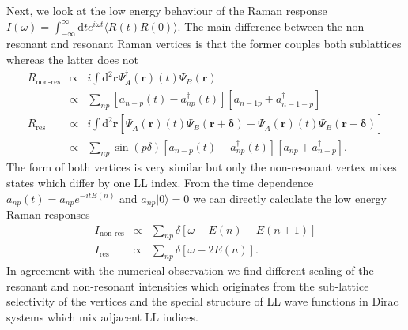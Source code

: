 \documentclass[reprint,amsmath,amssymb,aps,prl,groupedaddress,nofootinbib,superscriptaddress]{revtex4-1}
\newcommand{\1}{\mathds{1}}
\begin{document}
Next, we look at the low energy behaviour of the Raman response $I(\omega)=\int_{-\infty}^{\infty} \text{d}t e^{i\omega t} \langle R(t) R(0)\rangle$. The main difference between the non-resonant and resonant Raman vertices is that the former couples both sublattices whereas the latter does not
\begin{eqnarray}
R_{\text{non-res}} & \propto & i \int \text{d}^2 \mathbf{r}  \Psi^{\dagger}_A(\mathbf{r})(t) \Psi_B(\mathbf{r}) \\ \nonumber
& \propto & \sum_{np} \left[ a_{n-p}(t) -a^{\dagger}_{np} (t) \right] \left[ a_{n-1 p} + a^{\dagger}_{n-1 -p} \right] \\ \nonumber
R_{\text{res}} & \propto & i \int \text{d}^2 \mathbf{r} \left[ \Psi^{\dagger}_A(\mathbf{r})(t) \Psi_B(\mathbf{r+\delta}) - \Psi^{\dagger}_A(\mathbf{r})(t) \Psi_B(\mathbf{r-\delta}) \right] \\ \nonumber
& \propto & \sum_{np} \sin \left(p \delta \right) \left[ a_{n-p}(t) -a^{\dagger}_{np} (t) \right] \left[ a_{n p} + a^{\dagger}_{n -p} \right] .
\end{eqnarray}
The form of both vertices is very similar but only the non-resonant vertex mixes states which differ by one LL index. From the time dependence $a_{np}(t)=a_{np} e^{-i t E(n)}$ and $a_{np} |0\rangle=0$ we can directly calculate the low energy Raman responses
\begin{eqnarray}
I_{\text{non-res}} & \propto &  \sum_{np} \delta\left[\omega - E(n)-E(n+1) \right] \\ \nonumber
I_{\text{res}} & \propto &  \sum_{np} \delta\left[\omega - 2E(n)  \right] .
\end{eqnarray}
In agreement with the numerical observation we find different scaling of the resonant and non-resonant intensities which originates from the sub-lattice selectivity of the vertices and the special structure of LL wave functions in Dirac systems which mix adjacent LL indices. 
\end{document}
